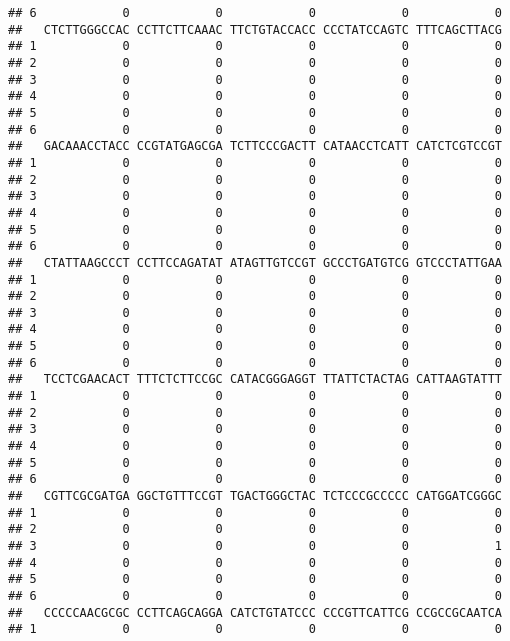 \documentclass[]{article}
\begin{document}
\begin{verbatim}
## 6            0            0            0            0            0
##   CTCTTGGGCCAC CCTTCTTCAAAC TTCTGTACCACC CCCTATCCAGTC TTTCAGCTTACG
## 1            0            0            0            0            0
## 2            0            0            0            0            0
## 3            0            0            0            0            0
## 4            0            0            0            0            0
## 5            0            0            0            0            0
## 6            0            0            0            0            0
##   GACAAACCTACC CCGTATGAGCGA TCTTCCCGACTT CATAACCTCATT CATCTCGTCCGT
## 1            0            0            0            0            0
## 2            0            0            0            0            0
## 3            0            0            0            0            0
## 4            0            0            0            0            0
## 5            0            0            0            0            0
## 6            0            0            0            0            0
##   CTATTAAGCCCT CCTTCCAGATAT ATAGTTGTCCGT GCCCTGATGTCG GTCCCTATTGAA
## 1            0            0            0            0            0
## 2            0            0            0            0            0
## 3            0            0            0            0            0
## 4            0            0            0            0            0
## 5            0            0            0            0            0
## 6            0            0            0            0            0
##   TCCTCGAACACT TTTCTCTTCCGC CATACGGGAGGT TTATTCTACTAG CATTAAGTATTT
## 1            0            0            0            0            0
## 2            0            0            0            0            0
## 3            0            0            0            0            0
## 4            0            0            0            0            0
## 5            0            0            0            0            0
## 6            0            0            0            0            0
##   CGTTCGCGATGA GGCTGTTTCCGT TGACTGGGCTAC TCTCCCGCCCCC CATGGATCGGGC
## 1            0            0            0            0            0
## 2            0            0            0            0            0
## 3            0            0            0            0            1
## 4            0            0            0            0            0
## 5            0            0            0            0            0
## 6            0            0            0            0            0
##   CCCCCAACGCGC CCTTCAGCAGGA CATCTGTATCCC CCCGTTCATTCG CCGCCGCAATCA
## 1            0            0            0            0            0

\end{verbatim}
\end{document}
